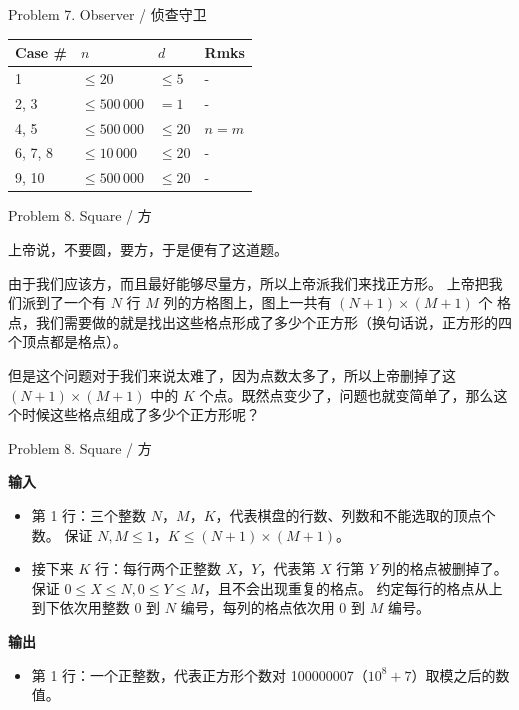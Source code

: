 \documentclass[UTF8]{beamer}
\begin{document}
\begin{frame}{Problem 7. Observer / 侦查守卫}

\begin{tabularx}{\textwidth}{X|X|X|X} \hline
Case \# & $n$ & $d$ & Rmks \\ \hline \hline
1       & $\leq 20$       & $\leq 5$  & - \\ \hline
2, 3    & $\leq 500\,000$ & $= 1$     & - \\ \hline
4, 5    & $\leq 500\,000$ & $\leq 20$ & $n = m$ \\ \hline
6, 7, 8 & $\leq 10\,000$  & $\leq 20$ & - \\ \hline
9, 10   & $\leq 500\,000$ & $\leq 20$ & - \\ \hline
\end{tabularx}

\end{frame}


\begin{frame}{Problem 8. Square / 方}

上帝说，不要圆，要方，于是便有了这道题。

由于我们应该方，而且最好能够尽量方，所以上帝派我们来找正方形。
上帝把我们派到了一个有 $N$ 行 $M$ 列的方格图上，图上一共有 $(N + 1) \times (M + 1)$ 个
格点，我们需要做的就是找出这些格点形成了多少个正方形（换句话说，正方形的四个顶点都是格点）。

但是这个问题对于我们来说太难了，因为点数太多了，所以上帝删掉了这 $(N + 1) \times (M + 1)$
中的 $K$ 个点。既然点变少了，问题也就变简单了，那么这个时候这些格点组成了多少个正方形呢？

\end{frame}

\begin{frame}{Problem 8. Square / 方}

\textbf{输入}
\begin{itemize}
    \item 第 1 行：三个整数 $N$，$M$，$K$，代表棋盘的行数、列数和不能选取的顶点个数。
                    保证 $N, M \leq 1$，$K \leq (N + 1) \times (M + 1)$。
    \item 接下来 $K$ 行：每行两个正整数 $X$，$Y$，代表第 $X$ 行第 $Y$ 列的格点被删掉了。
                    保证 $0 \leq X \leq N, 0 \leq Y \leq M$，且不会出现重复的格点。
                    约定每行的格点从上到下依次用整数 0 到 $N$ 编号，每列的格点依次用 0 到 $M$ 编号。
\end{itemize}
\textbf{输出}
\begin{itemize}
    \item 第 1 行：一个正整数，代表正方形个数对 100000007（$10^8 + 7$）取模之后的数值。
\end{itemize}

\end{frame}
\end{document}
